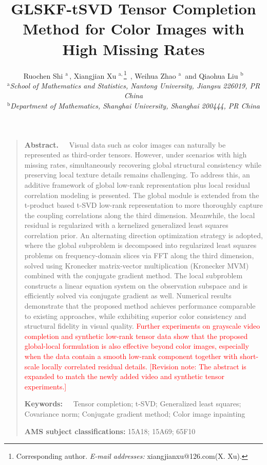 \documentclass[a4paper,12pt]{article}
\numberwithin{equation}{section}
\numberwithin{algorithm}{section}
\newcommand{\rev}[1]{\textcolor{red}{#1}}
\newcommand{\revnote}[1]{\textcolor{red}{[Revision note: #1]}}
\newcommand{\liuhao}{\fontsize{9pt}{10}\selectfont}
\theoremstyle{remark}
\theoremstyle{definition}
\begin{document}
\title{GLSKF-tSVD Tensor Completion Method for Color Images with High Missing Rates}
\author{Ruochen Shi $^{\mathrm{a}}$\,, Xiangjian Xu $^{\mathrm{a,}}$\thanks{\liuhao Corresponding author.   \newline
		\hspace*{17pt}\emph{E-mail addresses:} xiangjianxu@126.com(X. Xu).} \,, Weihua Zhao $^{\mathrm{a}}$\, and  Qiaohua Liu $^{\mathrm{b}}$\\
$^{\mathrm{a}}${\it\liuhao School of Mathematics and Statistics, Nantong University, Jiangsu 226019, PR China}\\
$^{\mathrm{b}}${\it\liuhao Department of Mathematics, Shanghai University, Shanghai 200444, PR China}	
}
\date{}
\maketitle
\begin{quote}
{\bf Abstract.~~} 
Visual data such as color images can naturally be represented as third-order tensors. However, under scenarios with high missing rates, simultaneously recovering global structural consistency while preserving local texture details remains challenging. To address this, an additive framework of global low-rank representation plus local residual correlation modeling is presented. The global module is extended from the  t-product based  t-SVD low-rank representation to more thoroughly capture the coupling correlations along the third dimension. Meanwhile, the local residual is regularized with a kernelized generalized least squares correlation prior.  
An alternating direction optimization strategy is adopted, where the global subproblem is decomposed into regularized least squares problems on frequency-domain slices via FFT along the third dimension, solved using Kronecker matrix-vector multiplication (Kronecker MVM) combined with the conjugate gradient method. The local subproblem constructs a linear equation system on the observation subspace and is efficiently solved via conjugate gradient as well.  
Numerical results demonstrate that the proposed method achieves performance comparable to existing approaches, while exhibiting superior color consistency and structural fidelity in visual quality. \rev{Further experiments on grayscale video completion and synthetic low-rank tensor data show that the proposed global-local formulation is also effective beyond color images, especially when the data contain a smooth low-rank component together with short-scale locally correlated residual details.} \revnote{The abstract is expanded to match the newly added video and synthetic tensor experiments.}

{\bf Keywords:~~} Tensor completion;  t-SVD; Generalized least squares; Covariance norm; Conjugate gradient method; Color image inpainting

{\bf AMS subject classifications: } 15A18; 15A69; 65F10
\end{quote}
\end{document}
